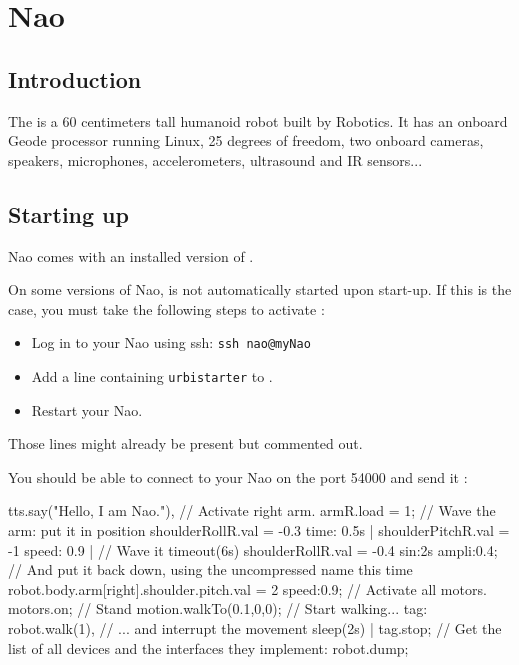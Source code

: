 
\newcommand{\naoqi}{NaoQi\xspace}

\chapter{Nao}
\label{sec:nao}

\section{Introduction}

The  is a 60 centimeters tall humanoid robot built by
 Robotics.  It has an onboard Geode processor running
Linux, 25 degrees of freedom, two onboard cameras, speakers,
microphones, accelerometers, ultrasound and IR sensors...

\section{Starting up}

Nao comes with an installed version of \urbi.

On some versions of Nao, \urbi is not automatically started upon start-up.
If this is the case, you must take the following steps to activate \urbi:

\begin{itemize}
\item Log in to your Nao using ssh: \lstinline|ssh nao@myNao|
\item Add a line containing \lstinline|urbistarter| to
  .
\item Restart your Nao.
\end{itemize}

Those lines might already be present but commented out.

You should be able to connect to your Nao on the port 54000 and send it \us:

\begin{urbiunchecked}
tts.say("Hello, I am Nao."),
// Activate right arm.
armR.load = 1;
// Wave the arm: put it in position
shoulderRollR.val = -0.3 time: 0.5s |
shoulderPitchR.val = -1 speed: 0.9 |
// Wave it
timeout(6s) shoulderRollR.val = -0.4 sin:2s ampli:0.4;
// And put it back down, using the uncompressed name this time
robot.body.arm[right].shoulder.pitch.val = 2 speed:0.9;
// Activate all motors.
motors.on;
// Stand
motion.walkTo(0.1,0,0);
// Start walking...
tag: robot.walk(1),
// ... and interrupt the movement
sleep(2s) | tag.stop;
// Get the list of all devices and the interfaces they implement:
robot.dump;
\end{urbiunchecked}

